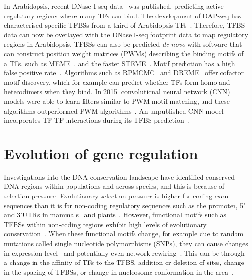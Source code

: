\documentclass[../main.tex]{subfiles}
\begin{document}
In Arabidopsis, recent DNase I\hyp{}seq data~\autocite{sullivanMappingDynamicsRegulatory2014} was published, predicting active regulatory regions where many TFs can bind.
The development of DAP\hyp{}seq has characterised specific TFBSs from a third of Arabidopsis TFs~\autocite{omalleyCistromeEpicistromeFeatures2016}.
Therefore, TFBS data can now be overlayed with the DNase I\hyp{}seq footprint data to map regulatory regions in Arabidopsis.
TFBSs can also be predicted \textit{de novo} with software that can construct position weight matrices (PWMs) describing the binding motifs of a TFs, such as MEME~\autocite{baileyFittingMixtureModel1994}, and the faster STEME~\autocite{reidSTEMEEfficientEM2011}.
Motif prediction has a high false positive rate~\autocite{zambelliMotifDiscoveryTranscription2013}.
Algorithms such as RPMCMC~\autocite{ikebataRepulsiveParallelMCMC2015} and DREME~\autocite{baileyDREMEMotifDiscovery2011} offer cofactor motif discovery, which for example can predict whether TFs form homo and heterodimers when they bind.
In 2015, convolutional neural network (CNN) models were able to learn filters similar to PWM motif matching, and these algorithms outperformed PWM algorithms~\autocite{alipanahiPredictingSequenceSpecificities2015}.
An unpublished CNN model incorporates TF\hyp{}TF interactions during its TFBS prediction~\autocite{lanchantinPrototypeMatchingNetworks2017}.

\section{Evolution of gene regulation}
 {\label{chapter1:evolution-of-gene-regulation}}
Investigations into the DNA conservation landscape have identified conserved DNA regions within populations and across species, and this is because of selection pressure.
Evolutionary selection pressure is higher for coding exon sequences than it is for non\hyp{}coding regulatory sequences such as the promoter, 5' and 3'UTRs in mammals~\autocite{lindblad-tohHighresolutionMapHuman2011} and
plants~\autocite{haudryAtlas900002013}.
However, functional motifs such as TFBSs within non\hyp{}coding regions exhibit high levels of evolutionary conservation~\autocite{zhaoConservedMotifsPrediction2012}.
When these functional motifs change, for example due to random mutations called single nucleotide polymorphisms (SNPs), they can cause changes in expression level~\autocite{rockmanAbundantRawMaterial2002} and potentially even network rewiring~\autocite{liEvolutionTranscriptionNetworks2010}.
This can be through a change in the affinity of TFs to the TFBS, addition or deletion of sites, change in the spacing of TFBSs, or change in nucleosome conformation in the area~\autocite{fyonEnhancerRunawayEvolution2015}.
\end{document}
